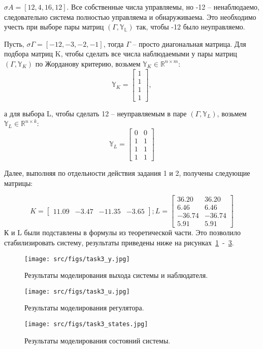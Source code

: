 \(\sigma A = [12, 4, 16, 12]\). Все собственные числа управляемы, но -12 -- ненаблюдаемо, следовательно система полностью управляема и обнаруживаема. Это необходимо учесть при выборе пары матриц \((\Gamma, \mathds{Y_L})\) так, чтобы -12 было неуправляемо. 

Пусть, \(\sigma \Gamma = [-12, -3, -2, -1]\), тогда \(\Gamma\) -- просто диагональная матрица. Для подбора матриц K, чтобы сделать все числа наблюдаемыми у пары матриц \((\Gamma, \mathds{Y}_K)\) по Жорданову критерию, возьмем \(\mathds{Y}_K \in \mathds{R}^{n \times m}\):
\[\mathds{Y}_K = \begin{bmatrix}
    1\\
    1\\
    1\\
    1
  \end{bmatrix},\]

а для выбора L, чтобы сделать 12 -- неуправляемым в паре \((\Gamma, \mathds{Y}_L)\), возьмем \(\mathds{Y}_L \in \mathds{R}^{n \times k}\):
\[\mathds{Y}_L = \begin{bmatrix}
    0 & 0\\
    1 & 1\\
    1 & 1\\
    1 & 1
  \end{bmatrix}\]

Далее, выполняя по отдельности действия задания 1 и 2, получены следующие матрицы:

\[
    K = \begin{bmatrix}
        11.09 & -3.47 & -11.35 & -3.65
      \end{bmatrix};
    L = \begin{bmatrix}
        36.20 &  36.20\\
        6.46 &  6.46\\
       -36.74 & -36.74\\
        5.91 &  5.91
      \end{bmatrix}
\]
К и L были подставлены в формулы из теоретической части. Это позволило стабилизировать систему, результаты приведены ниже на рисунках~\ref{fig:task3_y}~-~\ref{fig:task3_states}.
\begin{figure}[ht!]
    \centering
    \texttt{[image: src/figs/task3\_y.jpg]}
    \caption{Результаты моделирования выхода системы и наблюдателя.}
    \label{fig:task3_y}
\end{figure}
\begin{figure}[ht!]
    \centering
    \texttt{[image: src/figs/task3\_u.jpg]}
    \caption{Результаты моделирования регулятора.}
    \label{fig:task3_u}
\end{figure}
\begin{figure}[ht!]
    \centering
    \texttt{[image: src/figs/task3\_states.jpg]}
    \caption{Результаты моделирования состояний системы.}
    \label{fig:task3_states}
\end{figure}